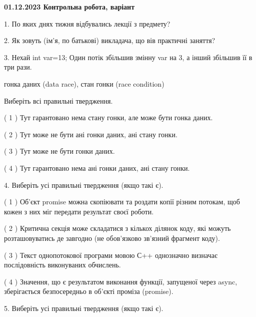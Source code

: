 \documentclass[12pt, ukrainian]{article}
\begin{document}
\vspace{4mm}
\newpage
\begin {large}

\textbf{01.12.2023 Контрольна робота, варіант  }\par


{
1. По яких днях тижня відбувались лекції з предмету?



\vspace{5mm}
2. Як зовуть (ім'я, по батькові) викладача, що вів практичні заняття?



\vspace{5mm}
3. Нехай int var=13; Один потік збільшив змінну var на 3, а інший збільшив її в три рази.

гонка даних (data race), стан гонки (race condition)

Виберіть всі правильні твердження.\par
\vspace{2mm}
( 1 ) Тут гарантовано нема стану гонки, але може бути гонка даних.%

( 2 ) Тут може не бути ані гонки даних, ані стану гонки.%

( 3 ) Тут може не бути гонки даних.%

( 4 ) Тут гарантовано нема ані гонки даних, ані стану гонки.%


\vspace{5mm}
4. Виберіть усі правильні твердження (якщо такі є).\par
\vspace{2mm}

( 1 ) Об’єкт promise можна скопіювати та роздати копії різним потокам, щоб кожен з них міг передати результат своєї роботи.%

( 2 ) Критична секція може складатися з кількох ділянок коду, які можуть розташовуватись де завгодно (не обов’язково зв’язний фрагмент коду).%

( 3 ) Текст однопотокової програми мовою С++ однозначно визначає послідовність виконуваних обчислень.%

( 4 ) Значення, що є результатом виконання функції, запущеної через async, зберігається безпосередньо в об’єкті проміза (promise).%


\vspace{5mm}
5. Виберіть усі правильні твердження (якщо такі є).\par
\vspace{2mm}

}
\end{large}
\end{document}
